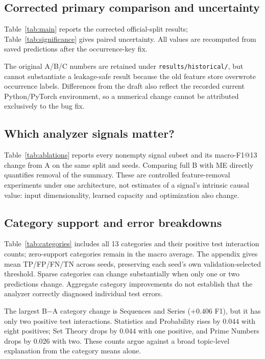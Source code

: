 \documentclass[11pt]{article}
\newcommand{\code}[1]{\texttt{\small #1}}
\begin{document}
\subsection{Corrected primary comparison and uncertainty}
Table~\ref{tab:main} reports the corrected official-split results; Table~\ref{tab:significance} gives paired uncertainty. All values are recomputed from saved predictions after the occurrence-key fix.



The original A/B/C numbers are retained under \code{results/historical/}, but cannot substantiate a leakage-safe result because the old feature store overwrote occurrence labels. Differences from the draft also reflect the recorded current Python/PyTorch environment, so a numerical change cannot be attributed exclusively to the bug fix.

\subsection{Which analyzer signals matter?}
Table~\ref{tab:ablations} reports every nonempty signal subset and its macro-F1@13 change from A on the same split and seeds. Comparing full B with ME directly quantifies removal of the summary. These are controlled feature-removal experiments under one architecture, not estimates of a signal's intrinsic causal value: input dimensionality, learned capacity and optimization also change.



\subsection{Category support and error breakdowns}
Table~\ref{tab:categories} includes all 13 categories and their positive test interaction counts; zero-support categories remain in the macro average. The appendix gives mean TP/FP/FN/TN across seeds, preserving each seed's own validation-selected threshold. Sparse categories can change substantially when only one or two predictions change. Aggregate category improvements do not establish that the analyzer correctly diagnosed individual test errors.

The largest B$-$A category change is Sequences and Series ($+0.406$ F1), but it has only two positive test interactions. Statistics and Probability rises by $0.044$ with eight positives; Set Theory drops by $0.044$ with one positive, and Prime Numbers drops by $0.026$ with two. These counts argue against a broad topic-level explanation from the category means alone.
\end{document}
